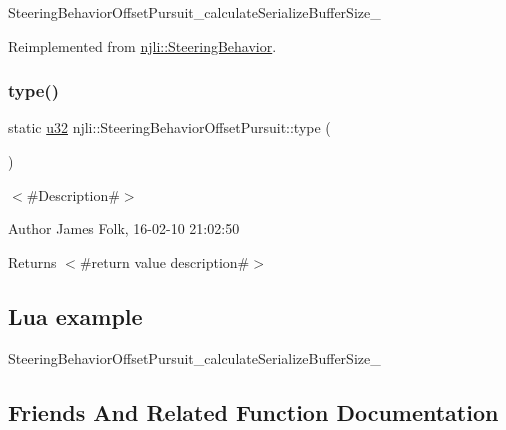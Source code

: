 \begin{DoxyCodeInclude}
\end{DoxyCodeInclude}
Steering\+Behavior\+Offset\+Pursuit\+\_\+calculate\+Serialize\+Buffer\+Size\+\_\+ 

Reimplemented from \mbox{\hyperlink{classnjli_1_1_steering_behavior_aa8494cb4a327c0040f64cfe8b393786e}{njli\+::\+Steering\+Behavior}}.

\mbox{\label{classnjli_1_1_steering_behavior_offset_pursuit_a23f3c1239ab265f2bb615d87fae18189}} 
\subsubsection{\texorpdfstring{type()}{type()}}
{\footnotesize\ttfamily static \mbox{\hyperlink{_util_8h_a10e94b422ef0c20dcdec20d31a1f5049}{u32}} njli\+::\+Steering\+Behavior\+Offset\+Pursuit\+::type (\begin{DoxyParamCaption}{ }\end{DoxyParamCaption})\hspace{0.3cm}{\ttfamily [static]}}



$<$\#\+Description\#$>$ 

\begin{DoxyAuthor}{Author}
James Folk, 16-\/02-\/10 21\+:02\+:50
\end{DoxyAuthor}
\begin{DoxyReturn}{Returns}
$<$\#return value description\#$>$
\end{DoxyReturn}
\hypertarget{classnjli_1_1_steering_behavior_wander_ex1}{}\subsection{Lua example}\label{classnjli_1_1_steering_behavior_wander_ex1}

\begin{DoxyCodeInclude}
\end{DoxyCodeInclude}
Steering\+Behavior\+Offset\+Pursuit\+\_\+calculate\+Serialize\+Buffer\+Size\+\_\+ 

\subsection{Friends And Related Function Documentation}
\mbox{\label{classnjli_1_1_steering_behavior_offset_pursuit_acb96ebb09abe8f2a37a915a842babfac}} 
